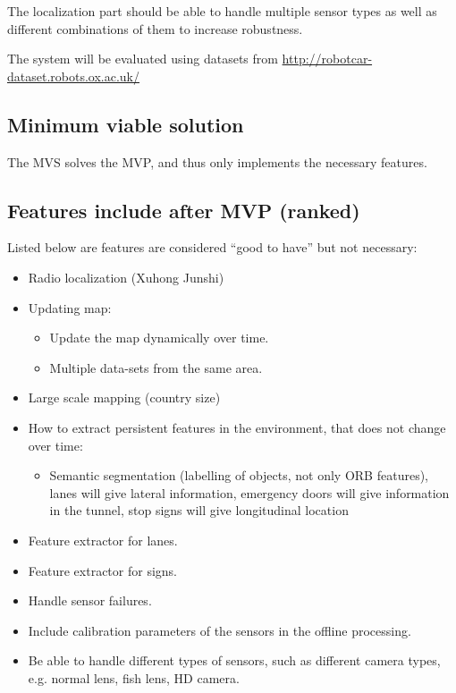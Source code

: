 The localization part should be able to handle multiple sensor types as well as different combinations of them to increase robustness.


The system will be evaluated using datasets from
\url{http://robotcar-dataset.robots.ox.ac.uk/}

\subsection{Minimum viable solution}


The \gls{MVS} solves the \gls{MVP}, and thus only implements the necessary
features.


\subsection{Features include after MVP (ranked)}

Listed below are features are considered ``good to have'' but not
necessary:

\begin{itemize}
\item Radio localization  (Xuhong  Junshi)
\item Updating map:
  \begin{itemize}
  \item Update the map dynamically over time.
  \item Multiple data-sets from the same area.
  \end{itemize}
\item Large scale mapping (country size)
\item How to extract persistent features in the environment, that does
  not change over time:
  \begin{itemize}
  \item  Semantic segmentation (labelling of objects, not only ORB
    features), lanes will give lateral information, emergency doors
    will give information in the tunnel, stop signs will give
    longitudinal location
  \end{itemize}
\item Feature extractor for lanes.
\item Feature extractor for signs.
\item Handle sensor failures.
\item Include calibration parameters of the sensors in the offline processing.
\item Be able to handle different types of sensors, such as different camera types, e.g. normal lens, fish lens, HD camera.
\end{itemize}

